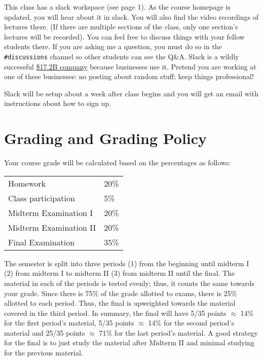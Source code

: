 \documentclass[12pt]{article}
\begin{document}
This class has a slack workspace (see page 1). As the course homepage is updated, you will hear about it in slack. You will also find the video recordings of lectures there. (If there are multiple sections of the class, only one section's lectures will be recorded). You can feel free to discuss things with your fellow students there. If you are asking me a question, you must do so in the \texttt{\#discussions} channel so other students can see the Q\&A. Slack is a wildly successful \href{https://www.google.com/search?tbm=fin&q=NYSE&q=WORK}{\$17.2B company} because businesses use it. Pretend you are working at one of these businesses: no posting about random stuff; keep things professional! 

Slack will be setup about a week after class begins and you will get an email with instructions about how to sign up.

\section*{Grading and Grading Policy}\label{sec:grading}

Your course grade will be calculated based on the percentages as follows: 

\begin{table}[h]
\centering
\begin{tabular}{l|l}
Homework & 20\% \\
Class participation & 5\% \\
Midterm Examination I & 20\%\\
Midterm Examination II & 20\%\\
Final Examination & 35\%
\end{tabular}
\end{table}
\FloatBarrier

The semester is split into three periods (1) from the beginning until midterm I (2) from midterm I to midterm II (3) from midterm II until the final. The material in each of the periods is tested evenly; thus, it counts the same towards your grade. Since there is 75\% of the grade allotted to exams, there is 25\% allotted to each period. Thus, the final is upweighted towards the material covered in the third period. In summary, the final will have 5/35 points $\approx$ 14\% for the first period's material, 5/35 points $\approx$ 14\% for the second period's material and 25/35 points $\approx$ 71\% for the last period's material. A good strategy for the final is to just study the material after Midterm II and minimal studying for the previous material.
\end{document}
